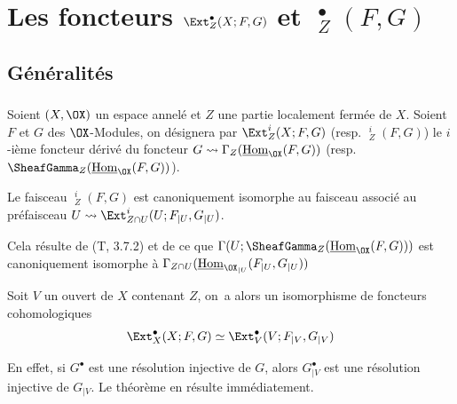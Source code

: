 \chapter{Les foncteurs $\Ext^{\bullet}_Z(X;F, G)$ et $\mathop{\underline{\mathrm{Ext}}}\nolimits^{\bullet}_Z(F, G)$} \label{VI}

\makeatletter{}\makeatother{}

\section{G\'en\'eralit\'es} \label{VI.1}
\enlargethispage{\baselineskip}%
\subsection{} \label{VI.1.1}
Soient $(X, \OX)$ un espace annel\'e et $Z$ une partie localement ferm\'ee de $X$. Soient $F$ et $G$ des $\OX$-Modules, on d\'esignera par ${\Ext_Z^i}(X;F, G)$ (resp. ${\mathop{\underline{\mathrm{Ext}}}\nolimits_Z^i}(F, G)$) le $i$-i\`eme foncteur d\'eriv\'e du foncteur $G \rightsquigarrow \Gamma_Z(\mathop{\underline{\mathrm{Hom}}}\nolimits_{\OX}(F, G))$ (resp. $\SheafGamma_Z(\mathop{\underline{\mathrm{Hom}}}\nolimits_{\OX}(F, G))$).

\begin{lemme} \label{VI.1.2}
Le faisceau ${\mathop{\underline{\mathrm{Ext}}}\nolimits_Z^i}(F, G)$ est canoniquement isomorphe au faisceau associ\'e au pr\'efaisceau $U\rightsquigarrow {\Ext_{Z\cap U}^i}(U;F_{|U}, G_{|U})$.
\end{lemme}

Cela r\'esulte de (T, 3.7.2) et de ce que $\Gamma(U;\SheafGamma_Z(\mathop{\underline{\mathrm{Hom}}}\nolimits_{\OX}(F, G)))$ est canoniquement isomorphe \`a $\Gamma_{Z\cap U}(\mathop{\underline{\mathrm{Hom}}}\nolimits_{{\OX}_{|U}}(F_{|U}, G_{|U}))$

\begin{theoreme} \label{VI.1.3}
Soit $V$ un ouvert de $X$ contenant $Z$, on~a alors un isomorphisme de foncteurs cohomologiques
\begin{equation} \label{VI.1.3.1}
\Ext_{X}^{\bullet}(X;F, G) \simeq \Ext_{V}^{\bullet}(V;F_{|V}, G_{|V})
\end{equation}
\end{theoreme}

En effet, si $G^\bullet$ est une r\'esolution injective de $G$, alors $G^\bullet_{|V}$ est une r\'esolution injective de $G_{|V}$. Le th\'eor\`eme en r\'esulte imm\'ediatement.

